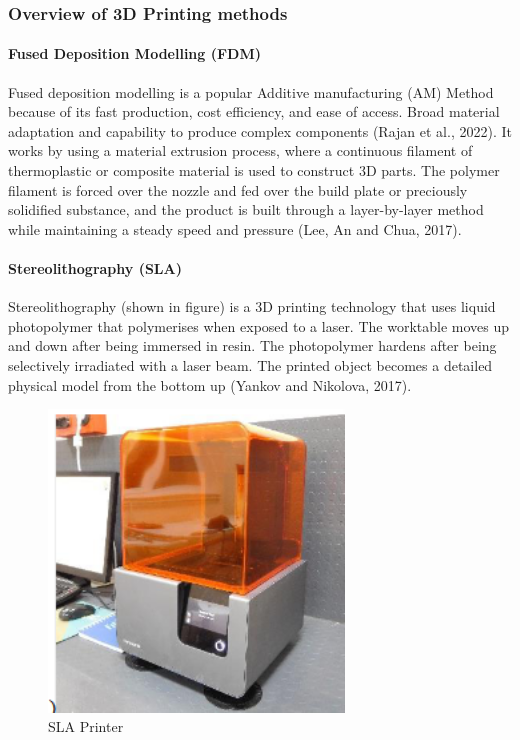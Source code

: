 \subsubsection{Overview of 3D Printing methods}

\paragraph{Fused Deposition Modelling (FDM)}

Fused deposition modelling is a popular Additive manufacturing (AM) Method because of its fast production, cost efficiency, and ease of access. 
Broad material adaptation and capability to produce complex components (Rajan et al., 2022). 
It works by using a material extrusion process, where a continuous filament of thermoplastic or composite material is used to construct 3D parts. 
The polymer filament is forced over the nozzle and fed over the build plate or preciously solidified substance, and the product is built through a layer-by-layer method while maintaining a steady speed and pressure (Lee, An and Chua, 2017). 

\paragraph{Stereolithography (SLA)}

Stereolithography (shown in figure) is a 3D printing technology that uses liquid photopolymer that polymerises when exposed to a laser. 
The worktable moves up and down after being immersed in resin.  
The photopolymer hardens after being selectively irradiated with a laser beam. 
The printed object becomes a detailed physical model from the bottom up (Yankov and Nikolova, 2017).

\begin{figure}[htbp]
    \centering
    \includegraphics[width=0.7\textwidth]{figures/CAD-3DPrint/SLAPrinter.png}
    \caption{SLA Printer}
    \label{fig:SLA}
\end{figure}

